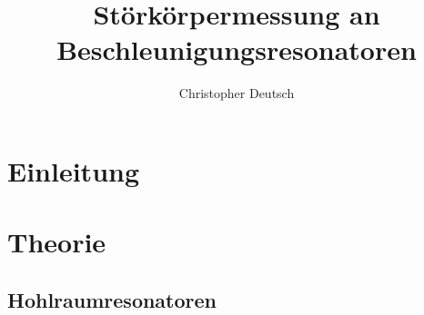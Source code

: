 \documentclass[11pt, a4paper]{scrbook}
\title{Störkörpermessung an Beschleunigungsresonatoren}
\author{Christopher Deutsch}
\begin{document}
	\frontmatter
	\maketitle
	\tableofcontents
	
	\mainmatter
	
	\chapter{Einleitung}
	
	\chapter{Theorie}
	
	\section{Hohlraumresonatoren}
	
\end{document}
